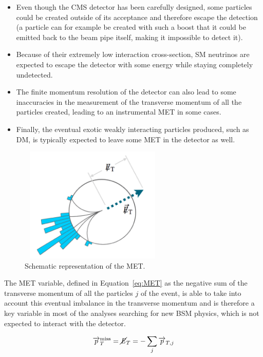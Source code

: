 \documentclass[a4paper, 10pt, openright]{report}
\begin{document}
\begin{itemize}
\item Even though the \ac{CMS} detector has been carefully designed, some particles could be created outside of its acceptance and therefore escape the detection (a particle can for example be created with such a boost that it could be emitted back to the beam pipe itself, making it impossible to detect it).
\item Because of their extremely low interaction cross-section, \ac{SM} neutrinos are expected to escape the detector with some energy while staying completely undetected.
\item The finite momentum resolution of the detector can also lead to some inaccuracies in the measurement of the transverse momentum of all the particles created, leading to an instrumental \ac{MET} in some cases.
\item Finally, the eventual exotic weakly interacting particles produced, such as \acf{DM}, is typically expected to leave some \ac{MET} in the detector as well.
\end{itemize}

\begin{figure}[htbp]
\begin{center}
\includegraphics[width=7cm, height=5.5cm]{figs/MET.png}
\caption{Schematic representation of the \ac{MET}.}
\label{fig:MET}
\end{center}
\end{figure}

The \ac{MET} variable, defined in Equation~\ref{eq:MET} as the negative sum of the transverse momentum of all the particles $j$ of the event, is able to take into account this eventual imbalance in the transverse momentum and is therefore a key variable in most of the analyses searching for new \ac{BSM} physics, which is not expected to interact with the detector.

\begin{equation}
\label{eq:MET}
\overrightarrow{p}_T^{\text{miss}} = \cancel{\it{E}}_{T} = - \sum_j \overrightarrow{p}_{T, j}
\end{equation}
\end{document}
